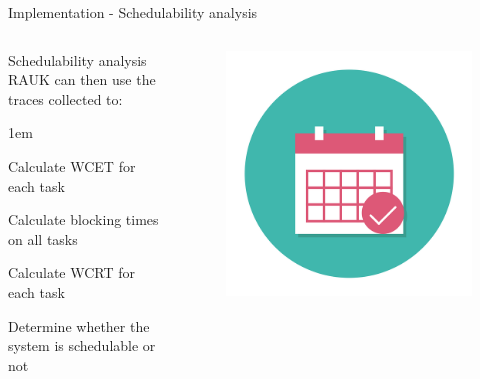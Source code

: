 \begin{frame}{Implementation - Schedulability analysis}
    \begin{columns}
        \begin{block}{Schedulability analysis}
            RAUK can then use the traces collected to:
            \begin{itemize-size}{1em}
                \item Calculate WCET for each task 
                \item Calculate blocking times on all tasks
                \item Calculate WCRT for each task
                \item Determine whether the system is schedulable or not
            \end{itemize-size}  
        \end{block}

        \begin{figure}
            \centering
            \includegraphics[scale=0.15]{pictures/schedule.png}
        \end{figure}
    \end{columns}


\end{frame}

